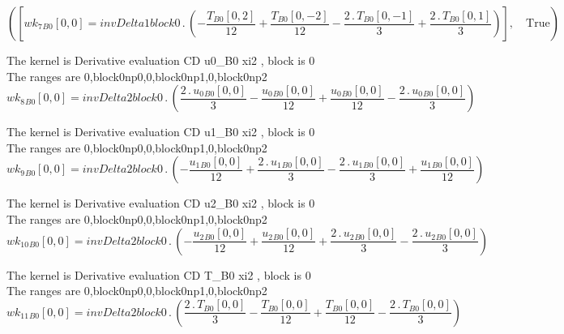 \documentclass{article}
\begin{document}
\begin{dmath}\left ( \left [ {wk_{7}{_{B0}}}[{0,0}] = invDelta1block0 \,.\, \left(- \frac{{T{_{B0}}}[{0,2}]}{12} + \frac{{T{_{B0}}}[{0,-2}]}{12} - \frac{2 \,.\, {T{_{B0}}}[{0,-1}]}{3} + \frac{2 \,.\, {T{_{B0}}}[{0,1}]}{3}\right)\right ], \quad 
\mathrm{True}\right )\end{dmath}

\noindent The kernel is Derivative evaluation CD u0_B0 xi2 , block is 0\\\noindent The ranges are 0,block0np0,0,block0np1,0,block0np2\\\begin{dmath}{wk_{8}{_{B0}}}[{0,0}] = invDelta2block0 \,.\, \left(\frac{2 \,.\, {u_{0}{_{B0}}}[{0,0}]}{3} - \frac{{u_{0}{_{B0}}}[{0,0}]}{12} + \frac{{u_{0}{_{B0}}}[{0,0}]}{12} - \frac{2 \,.\, {u_{0}{_{B0}}}[{0,0}]}{3}\right)\end{dmath}

\noindent The kernel is Derivative evaluation CD u1_B0 xi2 , block is 0\\\noindent The ranges are 0,block0np0,0,block0np1,0,block0np2\\\begin{dmath}{wk_{9}{_{B0}}}[{0,0}] = invDelta2block0 \,.\, \left(- \frac{{u_{1}{_{B0}}}[{0,0}]}{12} + \frac{2 \,.\, {u_{1}{_{B0}}}[{0,0}]}{3} - \frac{2 \,.\, {u_{1}{_{B0}}}[{0,0}]}{3} + \frac{{u_{1}{_{B0}}}[{0,0}]}{12}\right)\end{dmath}

\noindent The kernel is Derivative evaluation CD u2_B0 xi2 , block is 0\\\noindent The ranges are 0,block0np0,0,block0np1,0,block0np2\\\begin{dmath}{wk_{10}{_{B0}}}[{0,0}] = invDelta2block0 \,.\, \left(- \frac{{u_{2}{_{B0}}}[{0,0}]}{12} + \frac{{u_{2}{_{B0}}}[{0,0}]}{12} + \frac{2 \,.\, {u_{2}{_{B0}}}[{0,0}]}{3} - \frac{2 \,.\, {u_{2}{_{B0}}}[{0,0}]}{3}\right)\end{dmath}

\noindent The kernel is Derivative evaluation CD T_B0 xi2 , block is 0\\\noindent The ranges are 0,block0np0,0,block0np1,0,block0np2\\\begin{dmath}{wk_{11}{_{B0}}}[{0,0}] = invDelta2block0 \,.\, \left(\frac{2 \,.\, {T{_{B0}}}[{0,0}]}{3} - \frac{{T{_{B0}}}[{0,0}]}{12} + \frac{{T{_{B0}}}[{0,0}]}{12} - \frac{2 \,.\, {T{_{B0}}}[{0,0}]}{3}\right)\end{dmath}
\end{document}
